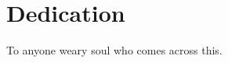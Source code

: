 \chapter*{Dedication}
\label{ch:list_of_appendices}
\vspace*{\fill}
\begin{center}
To anyone weary soul who comes across this.
\end{center}
\vfill
